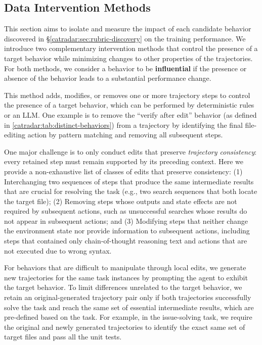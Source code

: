 \subsection{Data Intervention Methods}
\label{catradar:sec:controlled-exp}
This section aims to isolate and measure the impact of each candidate behavior discovered in \S\ref{catradar:sec:rubric-discovery} on the training performance.
We introduce two complementary intervention methods that control the presence of a target behavior while minimizing changes to other properties of the trajectories.
For both methods, we consider a behavior to be \textbf{influential} if the presence or absence of the behavior leads to a substantial performance change.


This method adds, modifies, or removes one or more trajectory steps to control the presence of a target behavior, which can be performed by deterministic rules or an LLM.
One example is to remove the ``verify after edit'' behavior (as defined in \autoref{catradar:tab:distinct-behaviors}) from a trajectory by identifying the final file-editing action by pattern matching and removing all subsequent steps.

One major challenge is to only conduct edits that preserve \emph{trajectory consistency}: every retained step must remain supported by its preceding context.
Here we provide a non-exhaustive list of classes of edits that preserve consistency:
(1) Interchanging two sequences of steps that produce the same intermediate results that are crucial for resolving the task (e.g., two search sequences that both locate the target file);
(2) Removing steps whose outputs and state effects are not required by subsequent actions, such as unsuccessful searches whose results do not appear in subsequent actions; and
(3) Modifying steps that neither change the environment state nor provide information to subsequent actions, including steps that contained only chain-of-thought reasoning text and actions that are not executed due to wrong syntax.


For behaviors that are difficult to manipulate through local edits, we generate new trajectories for the same task instances by prompting the agent to exhibit the target behavior.
To limit differences unrelated to the target behavior, we retain an original-generated trajectory pair only if both trajectories successfully solve the task and reach the same set of essential intermediate results, which are pre-defined based on the task.
For example, in the issue-solving task, we require the original and newly generated trajectories to identify the exact same set of target files and pass all the unit tests.


